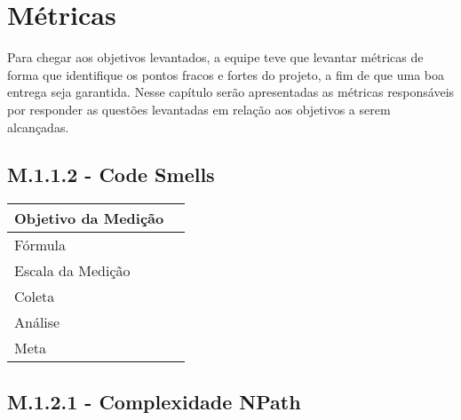 \chapter{Métricas}
	
	Para chegar aos objetivos levantados, a equipe teve que levantar métricas de forma que identifique os pontos fracos e fortes do projeto, a fim de que uma boa entrega seja garantida.
	Nesse capítulo serão apresentadas as métricas responsáveis por responder as questões levantadas em relação aos objetivos a serem alcançadas.

\section{M.1.1.2 - Code Smells} %

	\begin{tabular}{ |p{5cm}|p{5cm}|  }
	 \hline
	 Objetivo da Medição 		& 	   \\
	 \hline
	 Fórmula		& 		\\
	 \hline
	 Escala da Medição 		& 		 \\
	 \hline
	 Coleta		& 		\\
	 \hline
	 Análise		& 		 \\
	 \hline
	 Meta		& 		 \\
	 \hline
	\end{tabular}

\section{M.1.2.1 - Complexidade NPath}

